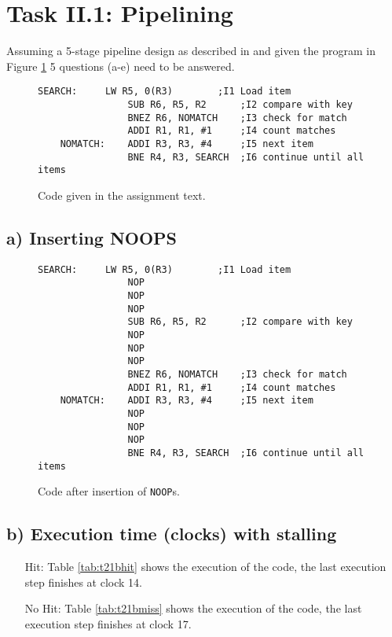 \section{Task II.1: Pipelining}

Assuming a 5-stage pipeline design as described in \cite{l3InOrder} and given
the program in Figure \ref{fig:t21code} 5 questions (a-e) need to be answered.

\begin{figure}[H]
    \begin{lstlisting}[language={[x86masm]Assembler}]
    SEARCH:     LW R5, 0(R3)        ;I1 Load item
                SUB R6, R5, R2      ;I2 compare with key
                BNEZ R6, NOMATCH    ;I3 check for match
                ADDI R1, R1, #1     ;I4 count matches
    NOMATCH:    ADDI R3, R3, #4     ;I5 next item
                BNE R4, R3, SEARCH  ;I6 continue until all items
    \end{lstlisting}
    \caption{Code given in the assignment text.}
    \label{fig:t21code}
\end{figure}

\subsection{a) Inserting NOOPS}

\begin{figure}[H]
    \begin{lstlisting}[language={[x86masm]Assembler}]
    SEARCH:     LW R5, 0(R3)        ;I1 Load item
                NOP
                NOP
                NOP
                SUB R6, R5, R2      ;I2 compare with key
                NOP
                NOP
                NOP
                BNEZ R6, NOMATCH    ;I3 check for match
                ADDI R1, R1, #1     ;I4 count matches
    NOMATCH:    ADDI R3, R3, #4     ;I5 next item
                NOP
                NOP
                NOP
                BNE R4, R3, SEARCH  ;I6 continue until all items
    \end{lstlisting}
    \caption{Code after insertion of \texttt{NOOP}s.}
    \label{fig:t21a}
\end{figure}

\subsection{b) Execution time (clocks) with stalling}
\begin{itemize}
    \item[Hit: ] Table \ref{tab:t21bhit} shows  the execution of the code, the
    last execution step finishes at clock 14.

    \item[No Hit: ] Table \ref{tab:t21bmiss} shows  the execution of the code, the
    last execution step finishes at clock 17.
\end{itemize}

